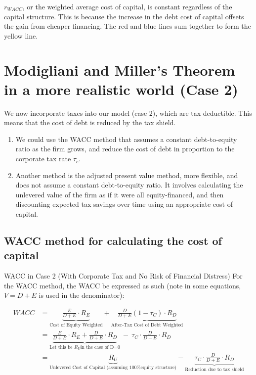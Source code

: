 $r_{WACC}$, or the weighted average cost of capital, is constant regardless of the capital structure. This is because the increase in the debt cost of capital offsets the gain from cheaper financing. The red and blue lines sum together to form the yellow line.


\section{Modigliani and Miller's Theorem in a more realistic world (Case 2)}

We now incorporate taxes into our model (case 2), which are tax deductible. This means that the cost of debt is reduced by the tax shield.

\begin{enumerate}
    \item We could use the WACC method that assumes a constant debt-to-equity ratio as the firm grows, and reduce the cost of debt in proportion to the corporate tax rate $\tau_c$.
    \item Another method is the adjusted present value method, more flexible, and does not assume a constant debt-to-equity ratio. It involves calculating the unlevered value of the firm as if it were all equity-financed, and then discounting expected tax savings over time using an appropriate cost of capital.
\end{enumerate}


\subsection*{WACC method for calculating the cost of capital}
\begin{definitionbox}{WACC in Case 2 (With Corporate Tax and No Risk of Financial Distress)}
    For the WACC method, the WACC be expressed as such (note in some equations, $V = D + E$ is used in the denominator):

\begin{align}
    WACC &= \underbrace{\frac{E}{D+E} \cdot R_E}_{\text{Cost of Equity Weighted}} + \underbrace{\frac{D}{D+E} (1-\tau_C) \cdot R_D}_{\text{After-Tax Cost of Debt Weighted}}\\
         &= \underbrace{\frac{E}{D+E} \cdot R_E + \frac{D}{D+E} \cdot R_D}_{\text{Let this be }R_U \text{in the case of D=0}}\ - \ \tau_C \cdot \frac{D}{D+E} \cdot R_D\\
         &= \underbrace{R_U}_{\text{Unlevered Cost of Capital (assuming 100\% equity structure)}} - \underbrace{\tau_C \cdot \frac{D}{D+E} \cdot R_D}_{\text{Reduction due to tax shield}}
\end{align}

\end{definitionbox}

